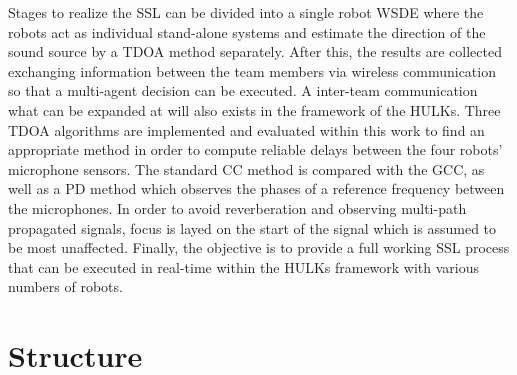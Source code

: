 Stages to realize the \ac{SSL} can be divided into a single robot \ac{WSDE} where
the robots act as individual stand-alone systems and estimate the direction of the
sound source by a \ac{TDOA} method separately.
After this, the results are collected exchanging information between the
team members via wireless communication so that a multi-agent decision can be executed.
A inter-team communication what can be expanded at will also exists in the framework of the HULKs.
Three \ac{TDOA} algorithms are implemented and evaluated within this work
to find an appropriate method in order to compute reliable delays between the four robots'
microphone sensors.
The standard \acf{CC} method is compared with the \acf{GCC}, as well as a \ac{PD} method which
observes the phases of a reference frequency between the microphones.
In order to avoid reverberation and observing multi-path propagated signals, focus is layed on the
start of the signal which is assumed to be most unaffected.
Finally, the objective is to provide a full working \ac{SSL} process that can be executed
in real-time within the HULKs framework with various numbers of robots.


\section{Structure}
\label{sec:01_Structure}


